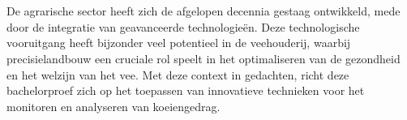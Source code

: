 
\chapter{}%
\label{ch:inleiding}

De agrarische sector heeft zich de afgelopen decennia gestaag ontwikkeld, mede door de integratie van geavanceerde technologieën. Deze technologische vooruitgang heeft bijzonder veel potentieel in de veehouderij, waarbij precisielandbouw een cruciale rol speelt in het optimaliseren van de gezondheid en het welzijn van het vee. Met deze context in gedachten, richt deze bachelorproef zich op het toepassen van innovatieve technieken voor het monitoren en analyseren van koeiengedrag.


\section{}%
\label{sec:probleemstelling}


